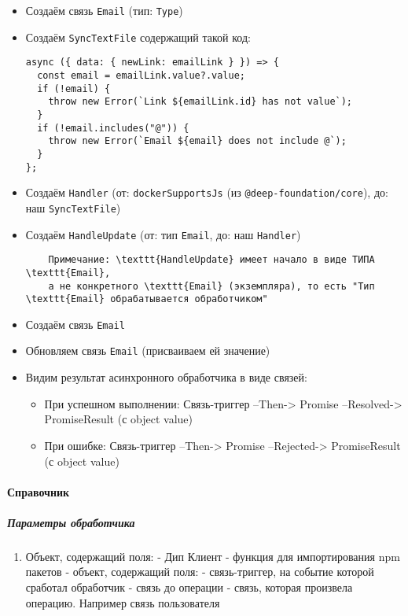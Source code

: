 \documentclass{article}
\begin{document}
\begin{itemize}
  \item Создаём связь \texttt{Email} (тип: \texttt{Type})
  \item Создаём \texttt{SyncTextFile} содержащий такой код:
        \begin{lstlisting}
async ({ data: { newLink: emailLink } }) => {
  const email = emailLink.value?.value;
  if (!email) {
    throw new Error(`Link ${emailLink.id} has not value`);
  }
  if (!email.includes("@")) {
    throw new Error(`Email ${email} does not include @`);
  }
};
\end{lstlisting}
  \item Создаём \texttt{Handler} (от: \texttt{dockerSupportsJs} (из
        \texttt{@deep-foundation/core}), до: наш \texttt{SyncTextFile})
  \item Создаём \texttt{HandleUpdate} (от: тип \texttt{Email}, до: наш
        \texttt{Handler})
        \begin{verbatim}
    Примечание: \texttt{HandleUpdate} имеет начало в виде ТИПА \texttt{Email},
    а не конкретного \texttt{Email} (экземпляра), то есть "Тип \texttt{Email} обрабатывается обработчиком"
    \end{verbatim}
  \item Создаём связь \texttt{Email}
  \item Обновляем связь \texttt{Email} (присваиваем ей значение)
  \item Видим результат асинхронного обработчика в виде связей:
        \begin{itemize}
          \item При успешном выполнении: Связь-триггер --Then-> Promise
                --Resolved-> PromiseResult (с object value)
          \item При ошибке: Связь-триггер --Then-> Promise --Rejected->
                PromiseResult (с object value)
        \end{itemize}
\end{itemize}

\paragraph{Справочник}
\subparagraph{Параметры обработчика}
\begin{enumerate}
  \item Объект, содержащий поля:
         - Дип Клиент
         - функция для импортирования npm пакетов
         - объект, содержащий поля:
         - связь-триггер, на событие которой сработал
        обработчик
         - связь до операции
         - связь, которая произвела операцию.
        Например связь пользователя
\end{enumerate}
\end{document}

